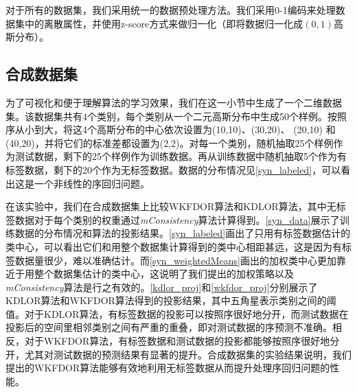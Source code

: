 对于所有的数据集，我们采用统一的数据预处理方法。我们采用0-1编码来处理数据集中的离散属性，并使用z-score方式来做归一化（即将数据归一化成\((0,1)\)高斯分布）。

\subsection{合成数据集}
为了可视化和便于理解算法的学习效果，我们在这一小节中生成了一个二维数据集。该数据集共有4个类别，每个类别从一个二元高斯分布中生成50个样例。按照序从小到大，将这4个高斯分布的中心依次设置为(10,10)、(30,20)、 (20,10) 和(40,20)，并将它们的标准差都设置为(2,2)。对每一个类别，随机抽取25个样例作为测试数据，剩下的25个样例作为训练数据。再从训练数据中随机抽取5个作为有标签数据，剩下的20个作为无标签数据。数据的分布情况见\autoref{syn_labeled}，可以看出这是一个非线性的序回归问题。

在该实验中，我们在合成数据集上比较WKFDOR算法和KDLOR算法，其中无标签数据对于每个类别的权重通过\textit{mConsistency}算法计算得到。\autoref{syn_data}展示了训练数据的分布情况和算法的投影结果。\autoref{syn_labeled}画出了只用有标签数据估计的类中心，可以看出它们和用整个数据集计算得到的类中心相距甚远，这是因为有标签数据量很少，难以准确估计。而\autoref{syn_weightedMeans}画出的加权类中心更加靠近于用整个数据集估计的类中心，这说明了我们提出的加权策略以及 \textit{mConsistency}算法是行之有效的。\autoref{kdlor_proj}和\autoref{wkfdor_proj}分别展示了KDLOR算法和WKFDOR算法得到的投影结果，其中五角星表示类别之间的阈值。对于KDLOR算法，有标签数据的投影可以按照序很好地分开，而测试数据在投影后的空间里相邻类别之间有严重的重叠，即对测试数据的序预测不准确。相反，对于WKFDOR算法，有标签数据和测试数据的投影都能够按照序很好地分开，尤其对测试数据的预测结果有显著的提升。合成数据集的实验结果说明，我们提出的WKFDOR算法能够有效地利用无标签数据从而提升处理序回归问题的性能。

